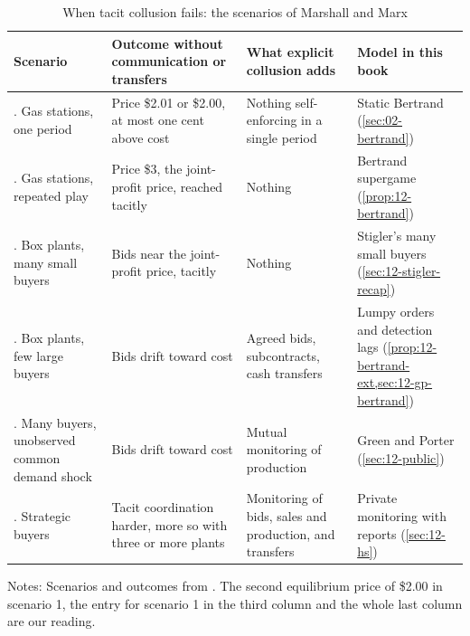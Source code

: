 \begin{table}[htbp]
\centering
\caption{When tacit collusion fails: the scenarios of Marshall and Marx}
\label{tab:12-mm-scenarios}
\small
\begin{threeparttable}
\begin{tabularx}{\textwidth}{@{}>{\raggedright\arraybackslash}p{2.7cm}
  >{\raggedright\arraybackslash}X >{\raggedright\arraybackslash}X >{\raggedright\arraybackslash}p{3.0cm}@{}}
\toprule
Scenario & Outcome without communication or transfers & What explicit collusion adds & Model in this book \\
\midrule
1. Gas stations, one period & Price \$2.01 or \$2.00, at most one cent above cost & Nothing self-enforcing in a single period &
Static Bertrand
(\cref{sec:02-bertrand}) \\
\addlinespace
2. Gas stations, repeated play & Price \$3, the joint-profit price, reached tacitly & Nothing & Bertrand supergame
(\cref{prop:12-bertrand}) \\
\addlinespace
3. Box plants, many small buyers & Bids near the joint-profit price, tacitly & Nothing & Stigler's many small buyers
(\cref{sec:12-stigler-recap}) \\
\addlinespace
4. Box plants, few large buyers & Bids drift toward cost & Agreed bids, subcontracts, cash transfers & Lumpy orders
and detection lags (\cref{prop:12-bertrand-ext,sec:12-gp-bertrand}) \\
\addlinespace
5. Many buyers, unobserved common demand shock & Bids drift toward cost & Mutual monitoring of production & Green
and Porter (\cref{sec:12-public}) \\
\addlinespace
6. Strategic buyers & Tacit coordination harder, more so with three or more plants & Monitoring of bids, sales and
production, and transfers & Private monitoring with reports (\cref{sec:12-hs}) \\
\bottomrule
\end{tabularx}
\begin{tablenotes}\footnotesize
\item Notes: Scenarios and outcomes from \citet[pp.~9--17]{MarshallMarx2012}. The second equilibrium price of
\$2.00 in scenario 1, the entry for scenario 1 in the third column and the whole last column are our reading.
\end{tablenotes}
\end{threeparttable}
\end{table}

